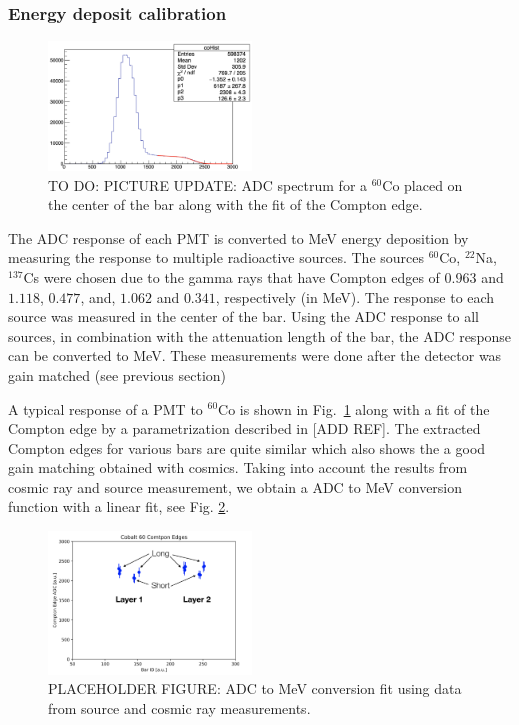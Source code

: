 \documentclass[3p,final,twocolumn]{elsarticle}
\begin{document}
\subsubsection{Energy deposit calibration}
\label{sec:energydeposit}
\begin{figure}[tbh]
	\centering
		\includegraphics[width=0.48\textwidth]{co-compton.png}
		\caption{TO DO: PICTURE UPDATE: ADC spectrum for a $^{60}$Co placed on the center of the bar along with the fit of the Compton edge.}
	\label{fig:compton_edge}
\end{figure}

The ADC response of each PMT is converted to \si{\mega\electronvolt} energy deposition by measuring the response to 
multiple radioactive sources. The sources $^{60}$Co, $^{22}$Na, $^{137}$Cs were chosen due to the gamma rays that have 
Compton edges of $0.963$ and $1.118$, $0.477$, and, $1.062$ and $0.341$, respectively (in \si{\mega\electronvolt}). The 
response to each source was measured in the center of the bar. Using the ADC response to all sources, in combination with the 
attenuation length of the bar, the ADC response can be converted to \si{\mega\electronvolt}. These measurements were done after the detector was gain matched (see previous section)

A typical response of a PMT to  $^{60}$Co is shown in Fig.~\ref{fig:compton_edge} along with a fit of the Compton edge by a parametrization described in [ADD REF]. The extracted Compton edges for various bars are quite similar which also shows the a good gain matching obtained with cosmics. Taking into account the results from cosmic ray and  source measurement, we obtain a ADC to MeV conversion function with a linear fit, see Fig. \ref{fig:mev_conversion}.


\begin{figure}[tbh]
	\centering
			\includegraphics[width=0.48\textwidth]{coedges.png}
	\caption{PLACEHOLDER FIGURE: ADC to MeV conversion fit using data from source and cosmic ray measurements.}
	\label{fig:mev_conversion}
\end{figure}
\end{document}
